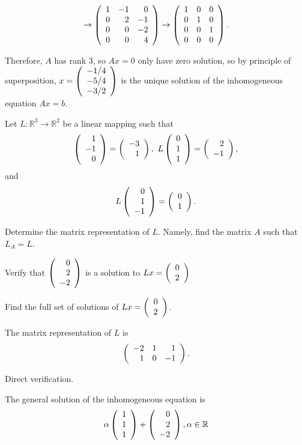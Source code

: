 \documentclass{ximera}
\begin{document}
\begin{exercise}
\begin{solution}
\[
\to \Matrix{1 &-1& 0\\ 0&2&-1 \\ 0&0&-2 \\ 0&0&4 } \to \Matrix{1 &0& 0 \\ 0&1&0 \\ 0&0&1  \\ 0&0&0 }.
\]

Therefore, $A$ has rank 3, so $Ax=0$ only have zero solution, so by principle of superposition,  $x=\Matrix{-1/4\\-5/4\\-3/2}$ is the unique solution of the inhomogeneous equation $Ax=b$.
\end{solution}
\end{exercise}


\begin{exercise} \label{YZ_3.4.7}
Let $L:\mathbb R^3\to \mathbb R^2$ be a linear mapping such that 
\[
\Matrix{1\\-1\\0}=\Matrix{-3\\1},~L\Matrix{0\\1\\1 }=\Matrix{2\\-1},
\]
and 
\[
L\Matrix{ 0\\1\\-1}=\Matrix{0\\1}.
\]


\begin{enumeratea}
\item Determine the matrix representation of $L$. Namely, find the matrix $A$ such that $L_A=L$.

\item Verify that  $\Matrix{0\\2\\-2}$ is a solution to $Lx=\Matrix{0\\2}$
\item Find the full set of solutions of $Lx=\Matrix{0\\2}$.
\end{enumeratea}


\begin{solution}

\ans 
\begin{enumeratea}
\item  The matrix representation of $L$ is 
 \[
\Matrix{ -2&1&1\\1&0&-1}.
\]

\item Direct verification.
\item The general solution of the inhomogeneous equation is 
\[
\alpha \Matrix{1\\1\\1}+\Matrix{0\\2\\-2}, \alpha\in \mathbb R
\]


\end{enumeratea}
\end{solution}
\end{exercise}
\end{document}
